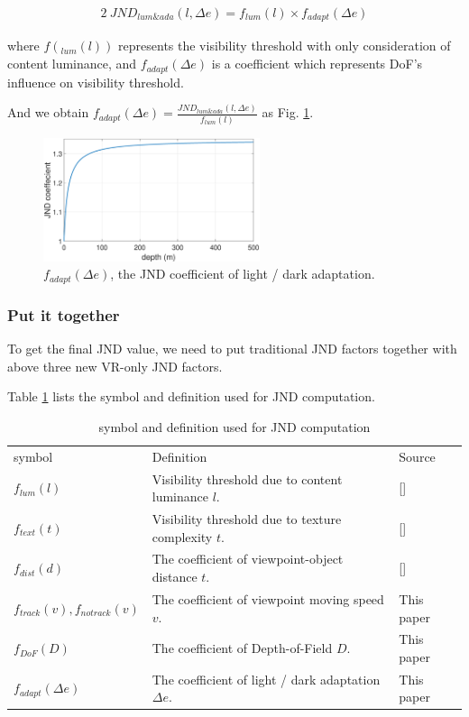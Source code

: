 \begin{alignat}{2}\
JND_{lum\&ada}(l, \Delta e) = f_{lum}(l) \times f_{adapt}(\Delta e)
\end{alignat}

where $f(_{lum}(l))$ represents the visibility threshold with only consideration of content luminance, and $f_{adapt}(\Delta e)$ is a coefficient which represents DoF's influence on visibility threshold.

And we obtain $f_{adapt}(\Delta e) = \frac{JND_{lum\&ada}(l, \Delta e)}{f_{lum}(l)}$ as Fig. \ref{JNDadapt}.

\begin{figure}
  \centering
  \includegraphics[width=2.5in]{images/JNDdof.eps}
  \caption{$f_{adapt}(\Delta e)$, the JND coefficient of light / dark adaptation.}
  \label{JNDadapt}
  \end{figure}

\subsubsection{Put it together}

To get the final JND value, we need to put traditional JND factors together with above three new VR-only JND factors. 

Table \ref{table2} lists the symbol and definition used for JND computation.

\begin{table}[h]
\centering
\caption{symbol and definition used for JND computation}\label{table2}
\begin{tabular}{|p{1.5cm}|p{4cm}|p{1.5cm}|}
\hline
symbol & Definition & Source\\
$f_{lum}(l)$ & Visibility threshold due to content luminance $l$. & []\\
$f_{text}(t)$ & Visibility threshold due to texture complexity $t$. & []\\
$f_{dist}(d)$ & The coefficient of viewpoint-object distance $t$. & []\\
$f_{track}(v), f_{notrack}(v)$ & The coefficient of viewpoint moving speed $v$. & This paper\\
$f_{DoF}(D)$ & The coefficient of Depth-of-Field $D$. & This paper\\
$f_{adapt}(\Delta e)$ & The coefficient of light / dark adaptation $\Delta e$. & This paper\\
\hline
\end{tabular}
\end{table}

